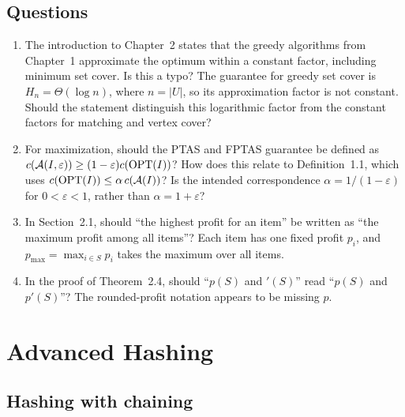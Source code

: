 \documentclass[12pt,a4paper]{article}
\begin{document}
\subsection*{Questions}
\begin{enumerate}
\item The introduction to Chapter~2 states that the greedy algorithms from
Chapter~1 approximate the optimum within a constant factor, including minimum
set cover. Is this a typo? The guarantee for greedy set cover is $H_n=\Theta(\log n)$,
where $n=|U|$, so its approximation factor is not constant. Should the statement
distinguish this logarithmic factor from the constant factors for matching
and vertex cover?
\item For maximization, should the PTAS and FPTAS guarantee be defined as
$c(\mathcal A(I,\varepsilon))\geq(1-\varepsilon)c(\operatorname{OPT}(I))$?
How does this relate to Definition~1.1, which uses
$c(\operatorname{OPT}(I))\leq\alpha\,c(\mathcal A(I))$?
Is the intended correspondence $\alpha=1/(1-\varepsilon)$ for
$0<\varepsilon<1$, rather than $\alpha=1+\varepsilon$?
\item In Section~2.1, should ``the highest profit for an item'' be written as
``the maximum profit among all items''? Each item has one fixed profit $p_i$,
and $p_{\max}=\max_{i\in S}p_i$ takes the maximum over all items.
\item In the proof of Theorem~2.4, should ``$p(S)$ and $'(S)$'' read
``$p(S)$ and $p'(S)$''? The rounded-profit notation appears to be missing $p$.
\end{enumerate}

\clearpage
\setcounter{section}{5}
\section{Advanced Hashing}
\setcounter{subsection}{2}
\subsection{Hashing with chaining}
\end{document}

